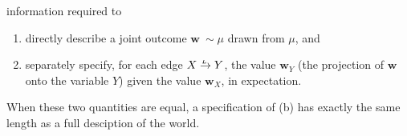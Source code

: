 \documentclass{article}
\theoremstyle{plain}
\theoremstyle{definition}
\theoremstyle{remark}
\newcommand\mat[1]{\mathbf{#1}}
\newcommand{\ed}[3]{#2
  \overset{\smash{\mskip-5mu\raisebox{-1pt}{$\scriptscriptstyle
        #1$}}}{\rightarrow} #3}
\numberwithin{equation}{section}
\begin{document}
information required to 
\begin{enumerate}[label=(\alph*)]
\item directly describe a joint outcome  $\mat w ~ \sim \mu$
          drawn from $\mu$, and 
	\item separately specify, for each edge $\ed LXY$, the value
          $\mat w_Y$ (the projection of $\mat w$ onto the variable
          $Y$) given the value $\mat w_X$, in expectation. 
\end{enumerate}
When these two quantities are equal,
a specification of
(b) has exactly the same length as
a full desciption of the world.
%
%
\end{document}
